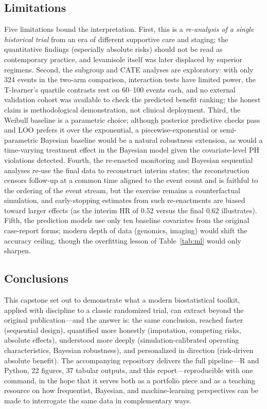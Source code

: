 \subsection{Limitations}

Five limitations bound the interpretation. First, this is a
\emph{re-analysis of a single historical trial} from an era of
different supportive care and staging; the quantitative findings
(especially absolute risks) should not be read as contemporary
practice, and levamisole itself was later displaced by superior
regimens. Second, the subgroup and CATE analyses are exploratory:
with only 324 events in the two-arm comparison, interaction tests have limited power,
the T-learner's quartile contrasts rest on 60--100 events each, and
no external validation cohort was available to check the predicted
benefit ranking; the honest claim is methodological demonstration,
not clinical deployment. Third, the Weibull baseline is a
parametric choice; although posterior predictive checks pass and LOO
prefers it over the exponential, a piecewise-exponential or
semi-parametric Bayesian baseline would be a natural robustness
extension, as would a time-varying treatment effect in the Bayesian
model given the covariate-level PH violations detected. Fourth, the
re-enacted monitoring and Bayesian sequential analyses re-use the
final data to reconstruct interim states; the reconstruction censors
follow-up at a common time aligned to the event count and is
faithful to the ordering of the event stream, but the exercise
remains a counterfactual simulation, and early-stopping estimates
from such re-enactments are biased toward larger effects (as the
interim HR of $0.52$ versus the final $0.62$ illustrates). Fifth, the
prediction models use only ten baseline covariates from the original
case-report forms; modern depth of data (genomics, imaging) would
shift the accuracy ceiling, though the overfitting lesson of
Table~\ref{tab:ml} would only sharpen.

\subsection{Conclusions}

This capstone set out to demonstrate what a modern biostatistical
toolkit, applied with discipline to a classic randomized trial, can
extract beyond the original publication---and the answer is: the same
conclusion, reached faster (sequential design), quantified more
honestly (imputation, competing risks, absolute effects), understood
more deeply (simulation-calibrated operating characteristics,
Bayesian robustness), and personalized in direction (risk-driven
absolute benefit). The accompanying repository delivers the full
pipeline---R and Python, 22 figures, 37 tabular outputs, and this
report---reproducible with one command, in the hope that it serves
both as a portfolio piece and as a teaching resource on how
frequentist, Bayesian, and machine-learning perspectives can be made
to interrogate the same data in complementary ways.

